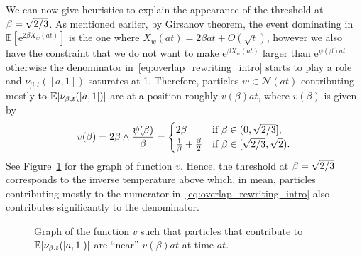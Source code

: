 \documentclass[AHL,Unicode,longabstracts,published]{cedram}
\newcommand{\e}{\mathrm{e}}
\newcommand{\E}{\mathbb{E}}
\newcommand\1{\mathds{1}}
\newcommand{\cN}{\mathcal{N}}
\newcommand{\Expec}[1]{\mathbb{E}\left[#1\right]}
\let\originalleft\left
\let\originalright\right
\renewcommand{\left}{\mathopen{}\mathclose\bgroup\originalleft}
\renewcommand{\right}{\aftergroup\egroup\originalright}
\begin{document}
We can now give heuristics to explain the appearance of the threshold at $\beta = \sqrt{2\smash{/}3}$. As mentioned earlier, by Girsanov theorem, the event dominating in $\E[\e^{2\beta X_w(at)}]$ is the one where $X_w(at) = 2\beta at + O(\sqrt{t})$, however we also have the constraint that we do not want to make $\e^{\beta X_w(at)}$ larger than $\e^{\psi(\beta)at}$ otherwise the denominator in~\eqref{eq:overlap_rewriting_intro} starts to play a role and $\nu_{\beta, t}([a, 1])$ saturates at 1. Therefore, particles $w\in \cN(at)$ contributing mostly to $\Expec{\nu_{\beta, t}([a, 1])}$ are at a position roughly $v(\beta) at$, where $v(\beta)$ is given by
\begin{equation}
v(\beta) = 2\beta \wedge \frac{\psi(\beta)}{\beta} =
\begin{cases}
2 \beta & \text{if } \beta \in (0,\sqrt{2\smash{/}3}], \\
\frac{1}{\beta} + \frac{\beta}{2} & \text{if } \beta \in [\sqrt{2\smash{/}3}, \sqrt{2}).
\end{cases}
\end{equation}
See Figure~\ref{fig:v(beta)} for the graph of function $v$. Hence, the threshold at $\beta = \sqrt{2\smash{/}3}$ corresponds to the inverse temperature above which, in mean, particles contributing mostly to the numerator in~\eqref{eq:overlap_rewriting_intro} also contributes significantly to the denominator.

\begin{figure}[!h]
\centering
{}
\caption{Graph of the function $v$ such that particles that contribute to $\Expec{\nu_{\beta, t}([a, 1])}$ are ``near'' $v(\beta)at$ at time $at$.}\label{fig:v(beta)}
\end{figure}
\end{document}
